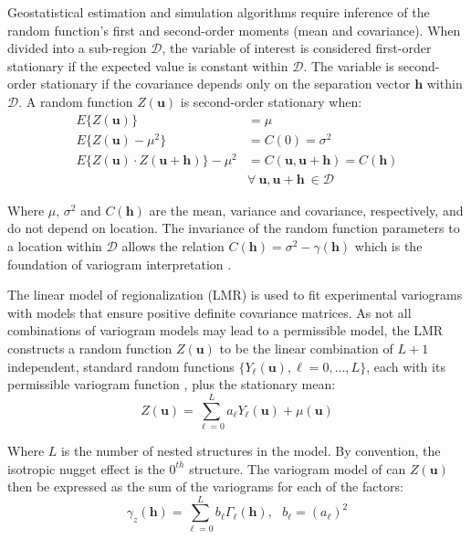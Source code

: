 Geostatistical estimation and simulation algorithms require inference of the random function's first and second-order moments (mean and covariance). When divided into a sub-region $\mathcal{D}$, the variable of interest is considered first-order stationary if the expected value is constant within $\mathcal{D}$. The variable is second-order stationary if the covariance depends only on the separation vector $\mathbf{h}$ within $\mathcal{D}$. A random function $Z(\mathbf{u})$ is second-order stationary when:
\begin{align*}
    E\{Z(\mathbf{u})\}                                          & = \mu                                                         \\
    E\{Z(\mathbf{u}) - \mu^2\}                                  & = C(0) = \sigma^2                                             \\
    E\{Z(\mathbf{u}) \cdot Z(\mathbf{u} + \mathbf{h})\} - \mu^2 & = C(\mathbf{u}, \mathbf{u}+\mathbf{h}) = C(\mathbf{h})        \\
                                                                & \forall \ \mathbf{u}, \mathbf{u}+\mathbf{h} \ \in \mathcal{D}
\end{align*}

Where $\mu$, $\sigma^2$ and $C(\mathbf{h})$ are the mean, variance and covariance, respectively, and do not depend on location. The invariance of the random function parameters to a location within $\mathcal{D}$ allows the relation $C(\mathbf{h}) = \sigma^2 - \gamma(\mathbf{h})$ which is the foundation of variogram interpretation \citep{pyrcz2014geostatistical}.

The linear model of regionalization (LMR) is used to fit experimental variograms with models that ensure positive definite covariance matrices. As not all combinations of variogram models may lead to a permissible model, the LMR constructs a random function $Z(\mathbf{u})$ to be the linear combination of $L+1$ independent, standard random functions $\{Y_{\ell}(\mathbf{u}), \ell=0,\dots,L\}$, each with its permissible variogram function \citep{goovaerts1997geostatistics}, plus the stationary mean:
\begin{equation*}
    Z(\mathbf{u}) = \sum_{\ell=0}^{L} a_{\ell} Y_{\ell}(\mathbf{u}) + \mu(\mathbf{u})
\end{equation*}

Where $L$ is the number of nested structures in the model. By convention, the isotropic nugget effect is the $0^{th}$ structure. The variogram model of can $Z(\mathbf{u})$ then be expressed as the sum of the variograms for each of the factors:
\begin{equation*}
    \gamma_z(\mathbf{h}) = \sum_{\ell=0}^{L} b_{\ell} \Gamma_{\ell}(\mathbf{h}), \ \ \ b_{\ell} = (a_{\ell})^{2}
\end{equation*}

